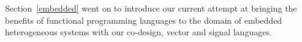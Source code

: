 \documentclass[../main.tex]{subfiles}
\begin{document}
Section~\ref{embedded} went on to introduce our current attempt at bringing the benefits of functional programming languages to the domain of embedded heterogeneous systems with our co-design, vector and signal languages.







\end{document}
